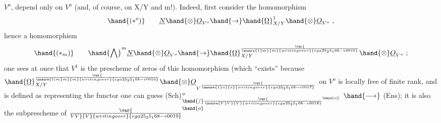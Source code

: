 $V^o$,   depend only on  $V^o$ (and, of course, on X/Y and
m!). Indeed, first consider the homomorphism
\[ \hand{(*^o)} \qquad \underline{N}\hand{\otimes}\underline{O}_{V^o}\hand{\to}\hand{\underline{\Omega}}^1_{X/Y}\hand{\otimes}\underline{O}_{V^o} \ , \]
hence a homomorphism
\[ \hand{(*_m)} \qquad \hand{\bigwedge}^m\underline{N}\hand{\otimes}\underline{O}_{V^o}\hand{\to}\hand{\underline{\Omega}}^{\var{\over{\unsure{1}}{m}}{m}{writing over}{ega25_25_168-v0015}}_{X/Y}\hand{\otimes}\underline{O}_{V^o}\ ; \]
one sees at once that $V^1$ is the prescheme of zeros of this homomorphism
(which ``exists'' because $\hand{\underline{\Omega}}^{\var{\over{\unsure{1|m}}{m}}{m}{writing over}{ega25_25_168-v0016}}_{X/Y}\hand{\otimes}\underline{O}_{V^{\var{\over{\unsure{1}}{o}}{o}{writing over}{ega25_25_168-v0017}}}$ on $V^o$ is locally free
of finite rank, and is defined as representing the functor one can guess
(Sch)$^o_{\hand{/}\var{\over{\unsure{V}}{V}}{V}{writing over}{ega25_25_168-v0018}^{\hand{o}}}$ $\hand{\longrightarrow}$ (Ens); it is also the subprescheme of $\var{\over{V}{V}}{V}{writing over}{ega25_25_168-v0019}^{\hand{o}}$

